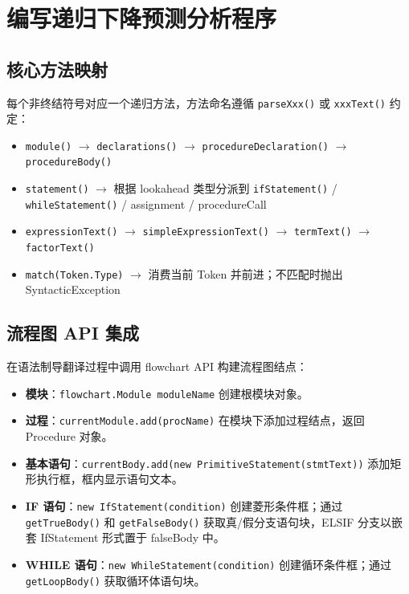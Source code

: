 \section{编写递归下降预测分析程序}

\subsection{核心方法映射}

每个非终结符号对应一个递归方法，方法命名遵循 \texttt{parseXxx()} 或 \texttt{xxxText()} 约定：

\begin{itemize}
    \item \texttt{module()} $\to$ \texttt{declarations()} $\to$ \texttt{procedureDeclaration()} $\to$ \texttt{procedureBody()}
    \item \texttt{statement()} $\to$ 根据 lookahead 类型分派到 \texttt{ifStatement()} / \texttt{whileStatement()} / assignment / procedureCall
    \item \texttt{expressionText()} $\to$ \texttt{simpleExpressionText()} $\to$ \texttt{termText()} $\to$ \texttt{factorText()}
    \item \texttt{match(Token.Type)} $\to$ 消费当前 Token 并前进；不匹配时抛出 SyntacticException
\end{itemize}

\subsection{流程图 API 集成}

在语法制导翻译过程中调用 flowchart API 构建流程图结点：

\begin{itemize}
    \item \textbf{模块}：\texttt{flowchart.Module moduleName} 创建根模块对象。
    \item \textbf{过程}：\texttt{currentModule.add(procName)} 在模块下添加过程结点，返回 Procedure 对象。
    \item \textbf{基本语句}：\texttt{currentBody.add(new PrimitiveStatement(stmtText))} 添加矩形执行框，框内显示语句文本。
    \item \textbf{IF 语句}：\texttt{new IfStatement(condition)} 创建菱形条件框；通过 \texttt{getTrueBody()} 和 \texttt{getFalseBody()} 获取真/假分支语句块，ELSIF 分支以嵌套 IfStatement 形式置于 falseBody 中。
    \item \textbf{WHILE 语句}：\texttt{new WhileStatement(condition)} 创建循环条件框；通过 \texttt{getLoopBody()} 获取循环体语句块。
\end{itemize}

